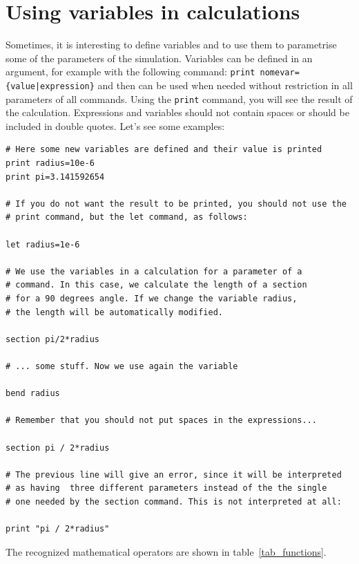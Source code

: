 \section{Using variables in calculations}
Sometimes, it is interesting to define variables and to use them to parametrise some of the parameters of the simulation. 
Variables can be defined in an argument, for example with the following command: \lstinline!print nomevar={value|expression}! and then can be used when needed without restriction in all parameters of all commands. Using the \lstinline!print! command, you will see the result of the calculation.
Expressions and variables should not contain spaces or should be included in double quotes. Let's see some examples:
\begin{lstlisting}
# Here some new variables are defined and their value is printed
print radius=10e-6
print pi=3.141592654

# If you do not want the result to be printed, you should not use the 
# print command, but the let command, as follows:

let radius=1e-6

# We use the variables in a calculation for a parameter of a 
# command. In this case, we calculate the length of a section 
# for a 90 degrees angle. If we change the variable radius, 
# the length will be automatically modified.

section pi/2*radius

# ... some stuff. Now we use again the variable

bend radius

# Remember that you should not put spaces in the expressions...

section pi / 2*radius

# The previous line will give an error, since it will be interpreted 
# as having  three different parameters instead of the the single 
# one needed by the section command. This is not interpreted at all:

print "pi / 2*radius"
\end{lstlisting}

The recognized mathematical operators are shown in table~\ref{tab_functions}.

